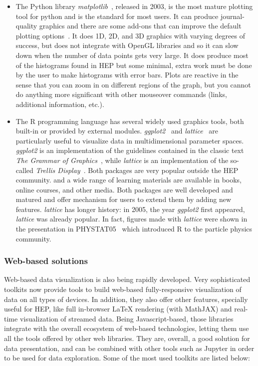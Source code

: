 \documentclass[12pt,a4paper]{article}
\begin{document}
\begin{itemize}
\item The Python library \textit{matplotlib}~\cite{Hunter2007}, released in 2003, is the most mature plotting tool for python and is the standard
for most users. It can produce journal-quality graphics and there are some add-ons that can improve the default plotting
options~\cite{seaborn}. It does 1D, 2D, and 3D graphics with varying degrees of success, but does not
integrate with OpenGL libraries and so it can slow down when the number of data points gets very large.
It does produce most of the histograms found in HEP but some minimal, extra work must be done by the user
to make histograms with error bars. Plots are reactive in the sense that you can zoom in on different regions of the graph,
but you cannot do anything more significant with other mouseover commands (links, additional information, etc.).

\item The R programming language has several widely used graphics tools, both built-in or provided by external modules.
\textit{ggplot2}~\cite{Wickham2009} and \textit{lattice}~\cite{Sarkar2008} are particularly useful to visualize data in multidimensional parameter spaces.
\textit{ggplot2} is an implementation of the guidelines contained in the classic text \textit{The Grammar of Graphics}~\cite{Wilkinson2005}, while \textit{lattice} is an implementation of the so-called \textit{Trellis Display}~\cite{Trellis}.
Both packages are very popular outside the HEP community. and a wide range of learning materials are available in books, online courses, and other media. Both packages are well developed and matured and offer mechanism for users to extend them by adding new features. 
\textit{lattice} has longer history: in 2005, the year \textit{ggplot2} first appeared, \textit{lattice} was already popular. In fact, figures made with \textit{lattice} were shown in the
presentation in PHYSTAT05~\cite{phystat05} which introduced R to the
particle physics community. 
\end{itemize}

\hypertarget{stats-web}{%
\subsubsection{Web-based solutions}\label{stats-web}}

Web-based data visualization is also being rapidly developed. Very sophisticated toolkits now provide tools to build web-based
fully-responsive visualization of data on all types of devices. In addition, they also offer other features, specially useful
for HEP, like full in-browser LaTeX rendering (with MathJAX) and real-time visualization of streamed data. Being Javascript-based,
those libraries integrate with the overall ecosystem of web-based technologies, letting them use all the tools offered by other
web libraries. They are, overall, a good solution for data presentation, and can be combined with other tools such as Jupyter
in order to be used for data exploration. Some of the most used toolkits are listed below:
\end{document}
